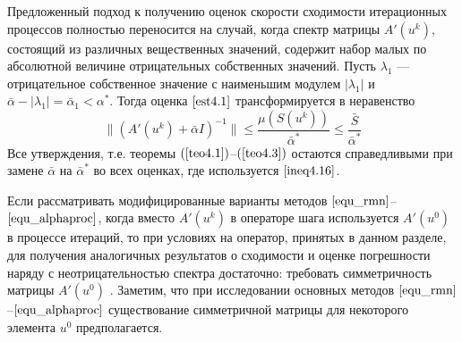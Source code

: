 \remark Предложенный подход к получению оценок скорости сходимости итерационных процессов полностью переносится на случай, когда спектр матрицы $A'(u^k)$, состоящий из различных вещественных значений, содержит набор малых по абсолютной величине отрицательных собственных значений. Пусть $\lambda _1$ --- отрицательное собственное значение с наименьшим модулем $|\lambda_1|$ и $\bar\alpha -|\lambda _1|=\bar\alpha _1<\alpha^*$. Тогда оценка $\eqref{est4.1}$ трансформируется в неравенство
\begin{equation}\label{ineq4.16}
\|(A'(u^k)+\bar\alpha I)^{-1}\|\le\frac{\mu(S(u^k))}{\bar\alpha^*}\le\frac{\bar S}{\bar\alpha^*}
\end{equation}
Все утверждения, т.е. теоремы $(\ref{teo4.1})$--$(\ref{teo4.3})$ остаются справедливыми при замене $\bar\alpha$ на $\bar\alpha^*$ во всех оценках, где используется $\eqref{ineq4.16}$.

\remark Если рассматривать модифицированные варианты методов $\eqref{equ_rmn}$--$\eqref{equ_alphaproc}$, когда вместо $A'(u^k)$ в операторе шага используется $A'(u^0)$ в процессе итераций, то при условиях на оператор, принятых в данном разделе, для получения аналогичных результатов о сходимости и оценке погрешности наряду с неотрицательностью спектра достаточно: требовать симметричность матрицы $A'(u^0)$ \cite{VasAkiMin2013, Vasin2014, Vasin2016}. Заметим, что при исследовании основных методов $\eqref{equ_rmn}$--$\eqref{equ_alphaproc}$ существование симметричной матрицы для некоторого элемента $u^0$ предполагается.

\newpage
